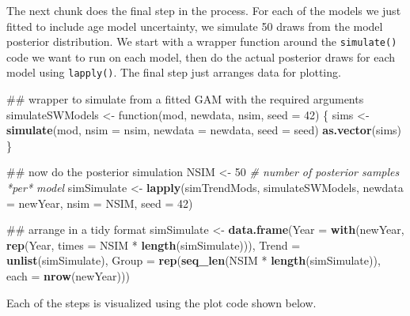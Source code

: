 \documentclass[12pt,]{article}
\newenvironment{Shaded}{\begin{snugshade}}{\end{snugshade}}
\newcommand{\KeywordTok}[1]{\textcolor[rgb]{0.13,0.29,0.53}{\textbf{{#1}}}}
\newcommand{\DataTypeTok}[1]{\textcolor[rgb]{0.13,0.29,0.53}{{#1}}}
\newcommand{\DecValTok}[1]{\textcolor[rgb]{0.00,0.00,0.81}{{#1}}}
\newcommand{\StringTok}[1]{\textcolor[rgb]{0.31,0.60,0.02}{{#1}}}
\newcommand{\CommentTok}[1]{\textcolor[rgb]{0.56,0.35,0.01}{\textit{{#1}}}}
\newcommand{\NormalTok}[1]{{#1}}
\begin{document}
The next chunk does the final step in the process. For each of the
models we just fitted to include age model uncertainty, we simulate 50
draws from the model posterior distribution. We start with a wrapper
function around the \texttt{simulate()} code we want to run on each
model, then do the actual posterior draws for each model using
\texttt{lapply()}. The final step just arranges data for plotting.

\begin{Shaded}
\begin{Highlighting}[]
\NormalTok{## wrapper to simulate from a fitted GAM with the required arguments}
\NormalTok{simulateSWModels <-}\StringTok{ }\NormalTok{function(mod, newdata, nsim, }\DataTypeTok{seed =} \DecValTok{42}\NormalTok{) \{}
    \NormalTok{sims <-}\StringTok{ }\KeywordTok{simulate}\NormalTok{(mod, }\DataTypeTok{nsim =} \NormalTok{nsim, }\DataTypeTok{newdata =} \NormalTok{newdata, }\DataTypeTok{seed =} \NormalTok{seed)}
    \KeywordTok{as.vector}\NormalTok{(sims)}
\NormalTok{\}}

\NormalTok{## now do the posterior simulation}
\NormalTok{NSIM <-}\StringTok{ }\DecValTok{50}     \CommentTok{# number of posterior samples *per* model}
\NormalTok{simSimulate <-}\StringTok{ }\KeywordTok{lapply}\NormalTok{(simTrendMods, simulateSWModels, }\DataTypeTok{newdata =} \NormalTok{newYear,}
                      \DataTypeTok{nsim =} \NormalTok{NSIM, }\DataTypeTok{seed =} \DecValTok{42}\NormalTok{)}

\NormalTok{## arrange in a tidy format}
\NormalTok{simSimulate <-}
\StringTok{  }\KeywordTok{data.frame}\NormalTok{(}\DataTypeTok{Year  =} \KeywordTok{with}\NormalTok{(newYear,}
                          \KeywordTok{rep}\NormalTok{(Year, }\DataTypeTok{times =} \NormalTok{NSIM *}\StringTok{ }\KeywordTok{length}\NormalTok{(simSimulate))),}
             \DataTypeTok{Trend =} \KeywordTok{unlist}\NormalTok{(simSimulate),}
             \DataTypeTok{Group =} \KeywordTok{rep}\NormalTok{(}\KeywordTok{seq_len}\NormalTok{(NSIM *}\StringTok{ }\KeywordTok{length}\NormalTok{(simSimulate)),}
                         \DataTypeTok{each =} \KeywordTok{nrow}\NormalTok{(newYear)))}
\end{Highlighting}
\end{Shaded}

Each of the steps is visualized using the plot code shown below.
\end{document}

